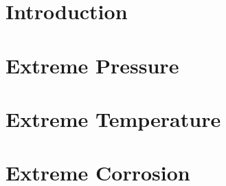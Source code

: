 \documentclass{hdnotes}
\begin{document}
\part{Introduction}


\part{Extreme Pressure}
\part{Extreme Temperature}



\part{Extreme Corrosion}

\end{document}
